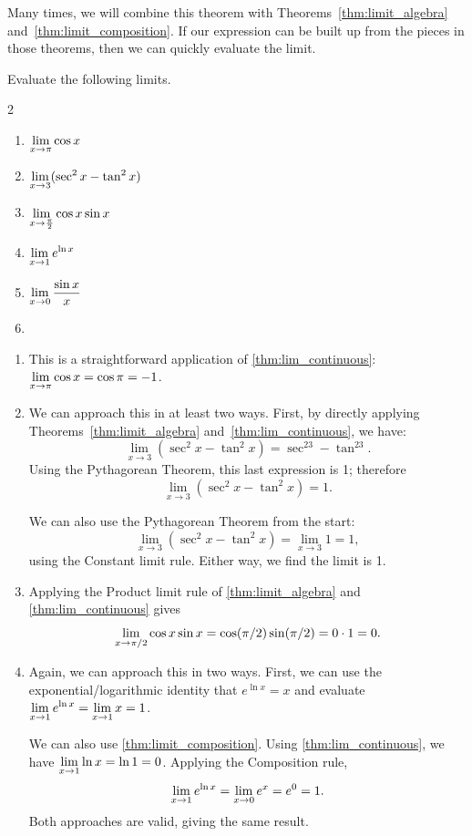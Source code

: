 Many times, we will combine this theorem with Theorems~\ref{thm:limit_algebra} and~\ref{thm:limit_composition}.  If our expression can be built up from the pieces in those theorems, then we can quickly evaluate the limit.

\begin{example}\label{ex_limit_1}%
Evaluate the following limits.
\begin{multicols}{2}
\begin{enumerate}
\item		$\displaystyle \lim_{x\to \pi} \cos x$
\item		$\displaystyle \lim_{x\to 3} (\sec^2x - \tan^2 x)$
\item		$\displaystyle \lim_{x\to \frac\pi2} \cos x\sin x$
\item		$\displaystyle \lim_{x\to 1} e^{\ln x}$
\item		$\displaystyle \lim_{x\to 0} \frac{\sin x}{x}$
\item[]
\end{enumerate}
\end{multicols}
\solution
\begin{enumerate}
	\item	This is a straightforward application of \autoref{thm:lim_continuous}:\\
	 $\displaystyle \lim_{x\to \pi} \cos x = \cos \pi = -1$.
	\item	We can approach this in at least two ways. First, by directly applying Theorems~\ref{thm:limit_algebra} and~\ref{thm:lim_continuous}, we have:
	\[\lim_{x\to 3} (\sec^2x - \tan^2 x) = \sec^23-\tan^23.\]
	Using the Pythagorean Theorem, this last expression is 1; therefore
	\[\lim_{x\to 3} (\sec^2x - \tan^2 x) = 1.\]

	We can also use the Pythagorean Theorem from the start:
	\[\lim_{x\to 3} (\sec^2x - \tan^2 x) = \lim_{x\to 3} 1 = 1,\]
	using the Constant limit rule. Either way, we find the limit is 1.
	
	\item	Applying the Product limit rule of \autoref{thm:limit_algebra} and \autoref{thm:lim_continuous} gives
	\[\displaystyle \lim_{x\to \pi/2} \cos x\sin x = \cos (\pi/2)\sin(\pi/2) = 0\cdot 1 = 0.\]

	\item	Again, we can approach this in two ways. First, we can use the exponential/logarithmic identity that $e^{\ln x} = x$ and evaluate $\displaystyle \lim_{x\to 1} e^{\ln x} = \lim_{x\to 1} x = 1$.

	We can also use \autoref{thm:limit_composition}. Using \autoref{thm:lim_continuous}, we have $\displaystyle \lim_{x\to 1}\ln x = \ln 1 = 0$. Applying the Composition rule,
	\[\displaystyle \lim_{x\to 1} e^{\ln x} = \lim_{x\to 0} e^x = e^0 = 1.\]
	Both approaches are valid, giving the same result.
		

\end{enumerate}
\end{example}

